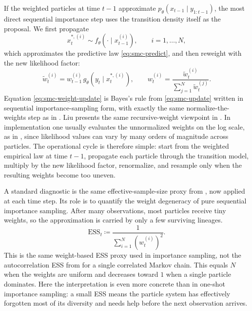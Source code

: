 If the weighted particles at time $t-1$ approximate $p_\theta(x_{t-1}\mid y_{1:t-1})$, the most direct sequential importance step uses the transition density itself as the proposal.
We first propagate
\begin{equation}
  x_t^{*,(i)} \sim f_\theta(\cdot \mid x_{t-1}^{(i)}),
  \qquad i=1,\dots,N,
  \label{eq:smc-propagate}
\end{equation}
which approximates the predictive law \eqref{eq:smc-predict}, and then reweight with the new likelihood factor:
\begin{equation}
  \tilde w_t^{(i)}
  =
  w_{t-1}^{(i)}\,g_\theta(y_t \mid x_t^{*,(i)}),
  \qquad
  w_t^{(i)}
  =
  \frac{\tilde w_t^{(i)}}{\sum_{j=1}^N \tilde w_t^{(j)}}.
  \label{eq:smc-weight-update}
\end{equation}
Equation \eqref{eq:smc-weight-update} is Bayes's rule from \eqref{eq:smc-update} written in sequential importance-sampling form, with exactly the same normalize-the-weights step as in .
Liu presents the same recursive-weight viewpoint in \citet[\S2.6.3]{liu_2002_monte_carlo}.
In implementation one usually evaluates the unnormalized weights on the log scale, as in , since likelihood values can vary by many orders of magnitude across particles.
The operational cycle is therefore simple: start from the weighted empirical law at time $t-1$, propagate each particle through the transition model, multiply by the new likelihood factor, renormalize, and resample only when the resulting weights become too uneven.

A standard diagnostic is the same effective-sample-size proxy from , now applied at each time step.
Its role is to quantify the weight degeneracy of pure sequential importance sampling.
After many observations, most particles receive tiny weights, so the approximation is carried by only a few surviving lineages.
\begin{equation}
  \mathrm{ESS}_t
  \coloneqq
  \frac{1}{\sum_{i=1}^N (w_t^{(i)})^2}.
  \label{eq:smc-ess}
\end{equation}
This is the same weight-based ESS proxy used in importance sampling, not the autocorrelation ESS from  for a single correlated Markov chain.
This equals $N$ when the weights are uniform and decreases toward $1$ when a single particle dominates.
Here the interpretation is even more concrete than in one-shot importance sampling:
a small ESS means the particle system has effectively forgotten most of its diversity and needs help before the next observation arrives.

